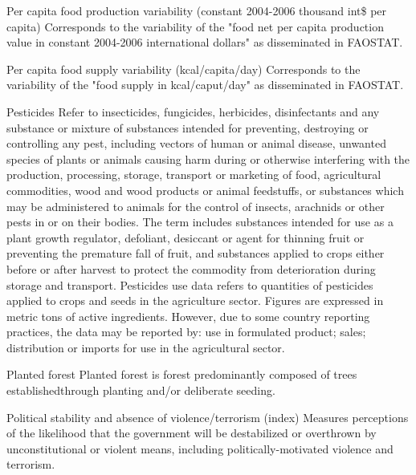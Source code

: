 \begin{MetadataCollection} {}
\begin{metadata}{Per capita food production variability (constant 2004-2006 thousand int\$ per capita)} {}
Corresponds to the variability of the "food net per capita production value in constant 2004-2006 international dollars" as disseminated in FAOSTAT.
\end{metadata}

\begin{metadata}{Per capita food supply variability (kcal/capita/day)} {}
Corresponds to the variability of the "food supply in kcal/caput/day" as disseminated in FAOSTAT.
\end{metadata}

\begin{metadata}{Pesticides} {}
Refer to insecticides, fungicides, herbicides, disinfectants and any substance or mixture of substances intended for preventing, destroying or controlling any pest, including vectors of human or animal disease, unwanted species of plants or animals causing harm during or otherwise interfering with the production, processing, storage, transport or marketing of food, agricultural commodities, wood and wood products or animal feedstuffs, or substances which may be administered to animals for the control of insects, arachnids or other pests in or on their bodies. The term includes substances intended for use as a plant growth regulator, defoliant, desiccant or agent for thinning fruit or preventing the premature fall of fruit, and substances applied to crops either before or after harvest to protect the commodity from deterioration during storage and transport. Pesticides use data refers to quantities of pesticides applied to crops and seeds in the agriculture sector. Figures are expressed in metric tons of active ingredients. However, due to some country reporting practices, the data may be reported by: use in formulated product; sales; distribution or imports for use in the agricultural sector. 
\end{metadata}

\begin{metadata}{Planted forest} {}
Planted forest is forest predominantly composed of trees establishedthrough planting and/or deliberate seeding.
\end{metadata}

\begin{metadata}{Political stability and absence of violence/terrorism (index)} {}
Measures perceptions of the likelihood that the government will be destabilized or overthrown by unconstitutional or violent means, including politically-motivated violence and terrorism.
\end{metadata}


\end{MetadataCollection}
